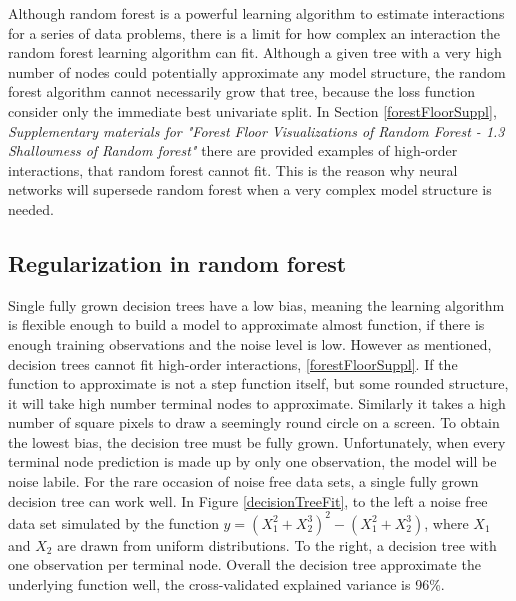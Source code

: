 Although random forest is a powerful learning algorithm to estimate interactions for a series of data problems, there is a limit for how complex an interaction the random forest learning algorithm can fit. Although a given tree with a very high number of nodes could potentially approximate any model structure, the random forest algorithm cannot necessarily grow that tree, because the loss function consider only the immediate best univariate split. In Section \ref{forestFloorSuppl}, \textit{Supplementary materials for "Forest Floor Visualizations of Random Forest - 1.3 Shallowness of Random forest"} there are provided examples of high-order interactions, that random forest cannot fit. This is the reason why neural networks will supersede random forest when a very complex model structure is needed.

\subsection{Regularization in random forest}
Single fully grown decision trees have a low bias, meaning the learning algorithm is flexible enough to build a model to approximate almost function, if there is enough training observations and the noise level is low. However as mentioned, decision trees cannot fit high-order interactions, \ref{forestFloorSuppl}. If the function to approximate is not a step function itself, but some rounded structure, it will take high number terminal nodes to approximate. Similarly it takes a high number of square pixels to draw a seemingly round circle on a screen. To obtain the lowest bias, the decision tree must be fully grown. Unfortunately, when every terminal node prediction is made up by only one observation, the model will be noise labile. For the rare occasion of noise free data sets, a single fully grown decision tree can work well. In Figure \ref{decisionTreeFit}, to the left a noise free data set simulated by the function $y=(X_1^2 + X_2^3)^2 - (X_1^2 + X_2^3)$, where $X_1$ and $X_2$ are drawn from uniform distributions. To the right, a decision tree with one observation per terminal node. Overall the decision tree approximate the underlying function well, the cross-validated explained variance is 96\%.

